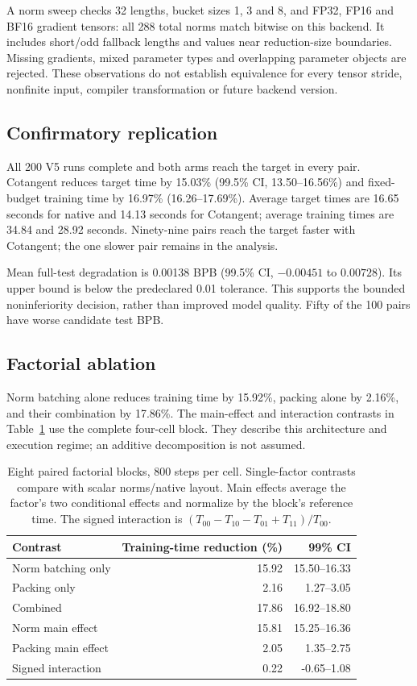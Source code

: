 \documentclass[11pt]{article}
\begin{document}
A norm sweep checks 32 lengths, bucket sizes 1, 3 and 8, and FP32, FP16 and
BF16 gradient tensors: all 288 total norms match bitwise on this backend.
It includes short/odd fallback lengths and values near reduction-size boundaries.
Missing gradients, mixed parameter types and overlapping parameter objects are
rejected. These observations do not establish equivalence for every tensor
stride, nonfinite input, compiler transformation or future backend version.

\subsection{Confirmatory replication}
All 200 V5 runs complete and both arms reach the target in every pair.
Cotangent reduces target time by 15.03\% (99.5\% CI, 13.50--16.56\%) and
fixed-budget training time by 16.97\% (16.26--17.69\%). Average target times
are 16.65 seconds for native and 14.13 seconds for Cotangent; average training
times are 34.84 and 28.92 seconds. Ninety-nine pairs reach the target faster
with Cotangent; the one slower pair remains in the analysis.

Mean full-test degradation is 0.00138 BPB (99.5\% CI, $-0.00451$ to
$0.00728$). Its upper bound is below the predeclared 0.01 tolerance. This
supports the bounded noninferiority decision, rather than improved model
quality. Fifty of the 100 pairs have worse candidate test BPB.

\subsection{Factorial ablation}
Norm batching alone reduces training time by 15.92\%, packing alone by 2.16\%, and their combination by 17.86\%. The main-effect and interaction contrasts in Table~\ref{tab:factorial} use the complete four-cell block. They describe this architecture and execution regime; an additive decomposition is not assumed.
\begin{table}[H]
\centering
\begin{tabular}{lrr}
\toprule
Contrast & Training-time reduction (\%) & 99\% CI\\
\midrule
Norm batching only & 15.92 & 15.50--16.33 \\
Packing only & 2.16 & 1.27--3.05 \\
Combined & 17.86 & 16.92--18.80 \\
Norm main effect & 15.81 & 15.25--16.36 \\
Packing main effect & 2.05 & 1.35--2.75 \\
Signed interaction & 0.22 & -0.65--1.08 \\
\bottomrule
\end{tabular}
\caption{Eight paired factorial blocks, 800 steps per cell. Single-factor
contrasts compare with scalar norms/native layout. Main effects average the
factor's two conditional effects and normalize by the block's reference time.
The signed interaction is $(T_{00}-T_{10}-T_{01}+T_{11})/T_{00}$.}
\label{tab:factorial}
\end{table}
\end{document}
